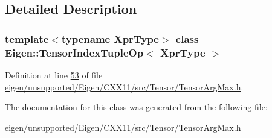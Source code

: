 \subsection{Detailed Description}
\subsubsection*{template$<$typename Xpr\+Type$>$\newline
class Eigen\+::\+Tensor\+Index\+Tuple\+Op$<$ Xpr\+Type $>$}



Definition at line \hyperlink{eigen_2unsupported_2_eigen_2_c_x_x11_2src_2_tensor_2_tensor_arg_max_8h_source_l00053}{53} of file \hyperlink{eigen_2unsupported_2_eigen_2_c_x_x11_2src_2_tensor_2_tensor_arg_max_8h_source}{eigen/unsupported/\+Eigen/\+C\+X\+X11/src/\+Tensor/\+Tensor\+Arg\+Max.\+h}.



The documentation for this class was generated from the following file\+:\begin{DoxyCompactItemize}
\item 
eigen/unsupported/\+Eigen/\+C\+X\+X11/src/\+Tensor/\+Tensor\+Arg\+Max.\+h\end{DoxyCompactItemize}
